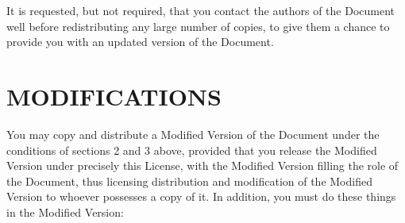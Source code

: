 \documentclass[oneside]{stacks-project-book}
\theoremstyle{plain}
\theoremstyle{definition}
\theoremstyle{remark}
\numberwithin{equation}{subsection}
\begin{document}
It is requested, but not required, that you contact the authors of the
Document well before redistributing any large number of copies, to give
them a chance to provide you with an updated version of the Document.


\section{MODIFICATIONS}
\label{fdl-section-modifications}
\hypertarget{05BJ}{}
\reversemarginpar{}

You may copy and distribute a Modified Version of the Document under
the conditions of sections 2 and 3 above, provided that you release
the Modified Version under precisely this License, with the Modified
Version filling the role of the Document, thus licensing distribution
and modification of the Modified Version to whoever possesses a copy
of it.  In addition, you must do these things in the Modified Version:
\end{document}
